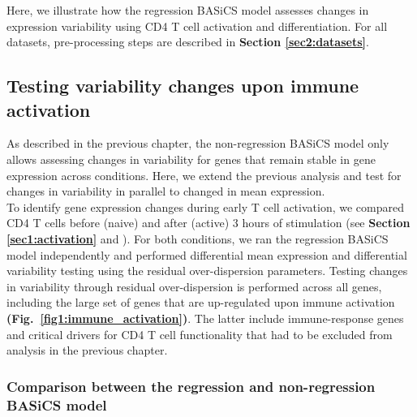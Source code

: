Here, we illustrate how the regression BASiCS model assesses changes in expression variability using CD4\plus{} T cell activation and differentiation. For all datasets, pre-processing steps are described in \textbf{Section \ref{sec2:datasets}}. 

\subsection{Testing variability changes upon immune activation}
\label{sec2:immune_activation}

As described in the previous chapter, the non-regression BASiCS model only allows assessing changes in variability for genes that remain stable in gene expression across conditions. Here, we extend the previous analysis and test for changes in variability in parallel to changed in mean expression. \\

To identify gene expression changes during early T cell activation, we compared CD4\plus{} T cells before (naive) and after (active) 3 hours of stimulation (see \textbf{Section \ref{sec1:activation}} and \citep{Martinez-jimenez2017}). For both conditions, we ran the regression BASiCS model independently and performed differential mean expression and differential variability testing using the residual over-dispersion parameters. Testing changes in variability through residual over-dispersion is performed across all genes, including the large set of genes that are up-regulated upon immune activation \textbf{(Fig.~\ref{fig1:immune_activation})}. The latter include immune-response genes and critical drivers for CD4\plus{} T cell functionality that had to be excluded from analysis in the previous chapter.

\subsubsection{Comparison between the regression and non-regression BASiCS model}

